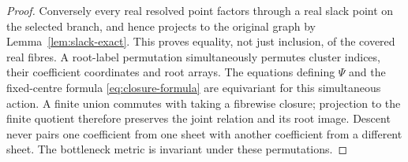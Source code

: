 \begin{proof}
Conversely every real resolved point factors through a real slack point
on the selected branch, and hence projects to the original graph by
Lemma~\ref{lem:slack-exact}. This proves equality, not just inclusion,
of the covered real fibres. A root-label permutation simultaneously
permutes cluster indices, their coefficient coordinates and root arrays.
The equations defining $\Psi$ and the fixed-centre formula
\eqref{eq:closure-formula} are equivariant for this simultaneous action.
A finite union commutes with taking a fibrewise closure; projection to the
finite quotient therefore preserves the joint relation and its root
image. Descent never pairs one coefficient from one sheet with another
coefficient from a different sheet. The bottleneck metric is invariant
under these permutations.
\end{proof}

